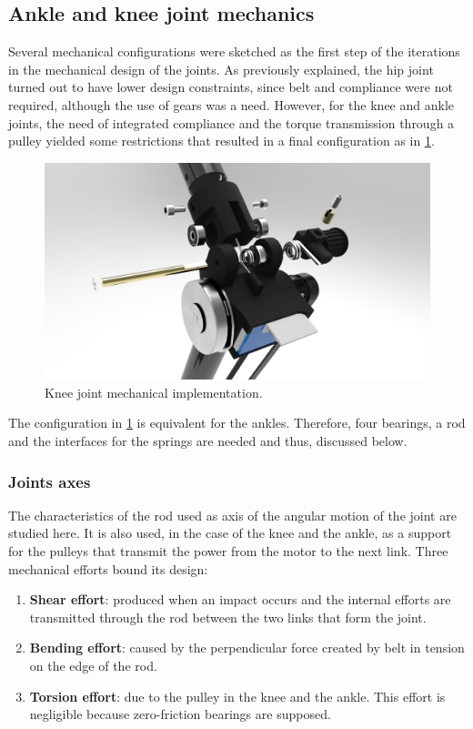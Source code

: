 
\subsection{Ankle and knee joint mechanics} %
\label{sub:hip_and_knee_joint_mechanics}
Several mechanical configurations were sketched as the first step of the iterations in the mechanical design of the joints.
As previously explained, the hip joint turned out to have lower design constraints, since belt and compliance were not required, although the use of gears was a need.
However, for the knee and ankle joints, the need of integrated compliance and the torque transmission through a pulley yielded some restrictions that resulted in a final configuration as in \ref{fig:knee_joint}.

\begin{figure}[htb]
  \centering
  \includegraphics[width=\textwidth]{figures/legs_knee_deconstructed.jpg}
  \caption{Knee joint mechanical implementation.}
  \label{fig:knee_joint}
\end{figure}

The configuration in \ref{fig:knee_joint} is equivalent for the ankles.
Therefore, four bearings, a rod and the interfaces for the springs are needed and thus, discussed below.

\subsubsection{Joints axes} %
\label{ssub:rods}
The characteristics of the rod used as axis of the angular motion of the joint are studied here.
It is also used, in the case of the knee and the ankle, as a support for the pulleys that transmit the power from the motor to the next link.
Three mechanical efforts bound its design:
\begin{enumerate}
  \item \textbf{Shear effort}: produced when an impact occurs and the internal efforts are transmitted through the rod between the two links that form the joint.
  \item \textbf{Bending effort}: caused by the perpendicular force created by belt in tension on the edge of the rod.
  \item \textbf{Torsion effort}: due to the pulley in the knee and the ankle. 
  This effort is negligible because zero-friction bearings are supposed.
\end{enumerate}

